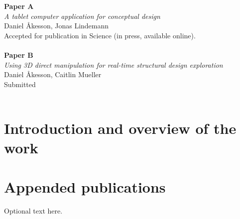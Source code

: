 \documentclass[twoside,openright,11pt]{book}
\begin{document}
\noindent 
\textbf{Paper A} \\
\textsl{A tablet computer application for conceptual design} \\
Daniel Åkesson, Jonas Lindemann\\
Accepted for publication in Science (in press, available online). \\ \\
\textbf{Paper B} \\
\textsl{Using 3D direct manipulation for real-time structural design exploration} \\
Daniel Åkesson, Caitlin Mueller\\
Submitted \\ \\

\part{Introduction and overview of the work}
\mainmatter
\pagestyle{fancy}
 
% 
%
%

\renewcommand{\bibname}{References}
\backmatter
\clearpage
{}
{}



\pagestyle{empty}
\part{Appended publications}
\thispagestyle{empty}

\cleardoublepage
\thispagestyle{empty}
\vspace*{2cm} %
\begin{minipage}{8cm}
Optional text here.
\end{minipage}%
\hfill{ 
\fontsize{20}{30}\selectfont {\bf Paper~A}}\marginpar{\rule[-4mm]{50mm}{14mm}} %
\vfill

\cleardoublepage

\end{document}
